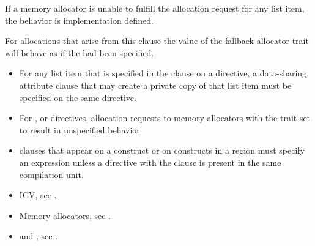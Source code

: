 If a memory allocator is unable to fulfill the 
allocation request for any list item, the behavior is implementation defined.

For allocations that arise from this clause the  value of the 
fallback allocator trait will behave as if the  had been specified.

\restrictions
\begin{itemize}
\item For any list item that is specified in the  clause on a 
      directive, a data-sharing attribute clause that may create a private copy 
      of that list item must be specified on the same directive.
\item For ,  or  directives, allocation 
      requests to memory allocators with the trait  set to 
       result in unspecified behavior.
\item {} clauses that appear on a  construct or on
      constructs in a  region must specify an  
      expression unless a  directive with the 
      clause is present in the same compilation unit.
\end{itemize}

\crossreferences
\begin{itemize}
\item {} ICV, see .

\item Memory allocators, see .

\item {} and , 
see .
\end{itemize}

